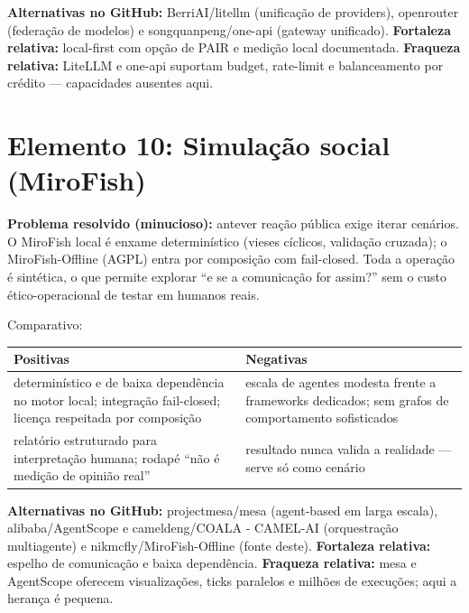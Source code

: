 \begin{metodo}
\textbf{Alternativas no GitHub:} BerriAI/litellm (unificação de providers),
openrouter (federação de modelos) e songquanpeng/one-api (gateway unificado).
\textbf{Fortaleza relativa:} local-first com opção de PAIR e medição local
documentada. \textbf{Fraqueza relativa:} LiteLLM e one-api suportam budget,
rate-limit e balanceamento por crédito — capacidades ausentes aqui.
\end{metodo}

\clearpage
\section{Elemento 10: Simulação social (MiroFish)}


\begin{funcao}
\textbf{Problema resolvido (minucioso):} antever reação pública exige iterar
cenários. O MiroFish local é enxame determinístico (vieses cíclicos, validação
cruzada); o MiroFish-Offline (AGPL) entra por composição com fail-closed. Toda a
operação é sintética, o que permite explorar ``e se a comunicação for assim?''
sem o custo ético-operacional de testar em humanos reais.
\end{funcao}

\begin{resultado}
Comparativo:\par
\smallskip
{\footnotesize
\begin{tabularx}{\linewidth}{YY}
\toprule
Positivas & Negativas \\
\midrule
determinístico e de baixa dependência no motor local; integração fail-closed;
licença respeitada por composição & escala de agentes modesta frente a frameworks
dedicados; sem grafos de comportamento sofisticados \\
relatório estruturado para interpretação humana; rodapé ``não é medição de
opinião real'' & resultado nunca valida a realidade — serve só como cenário \\
\bottomrule
\end{tabularx}\par}
\end{resultado}

\begin{metodo}
\textbf{Alternativas no GitHub:} projectmesa/mesa (agent-based em larga escala),
alibaba/AgentScope e cameldeng/COALA - CAMEL-AI (orquestração multiagente) e
nikmcfly/MiroFish-Offline (fonte deste). \textbf{Fortaleza relativa:} espelho de
comunicação e baixa dependência. \textbf{Fraqueza relativa:} mesa e AgentScope
oferecem visualizações, ticks paralelos e milhões de execuções; aqui a herança é
pequena.
\end{metodo}

